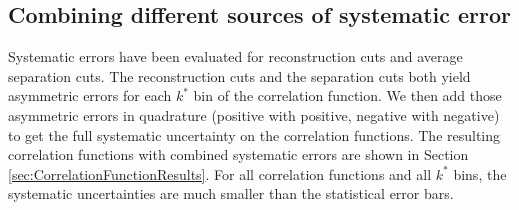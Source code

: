 \subsection{Combining different sources of systematic error}
\label{sec:CombiningSys}

Systematic errors have been evaluated for reconstruction cuts and average separation cuts.
The reconstruction cuts and the separation cuts both yield asymmetric errors for each $k^*$ bin of the correlation function.
We then add those asymmetric errors in quadrature (positive with positive, negative with negative) to get the full systematic uncertainty on the correlation functions.
The resulting correlation functions with combined systematic errors are shown in Section \ref{sec:CorrelationFunctionResults}.
For all correlation functions and all $k^*$ bins, the systematic uncertainties are much smaller than the statistical error bars.

